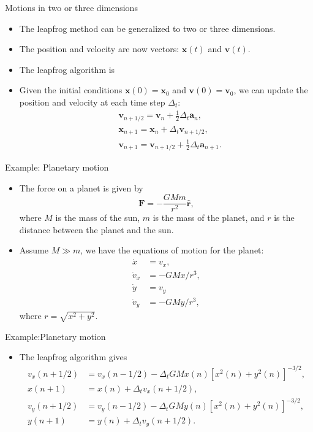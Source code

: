 \documentclass{beamer}
\begin{document}
 \begin{frame}{Motions in two or three dimensions}
  \begin{itemize}
    \item The leapfrog method can be generalized to two or three dimensions.
    \item The position and velocity are now vectors: $\mathbf{x}(t)$ and $\mathbf{v}(t)$.
    \item The leapfrog algorithm is
    \item Given the initial conditions $\mathbf{x}(0)=\mathbf{x}_0$ and $\mathbf{v}(0)=\mathbf{v}_0$, we can update the position and velocity at each time step $\Delta_t$:
    \begin{align*}
      & \mathbf{v}_{n+1 / 2}=\mathbf{v}_n+\frac{1}{2} \Delta_t \mathbf{a}_n, \\
      & \mathbf{x}_{n+1}=\mathbf{x}_n+\Delta_t \mathbf{v}_{n+1 / 2}, \\
      & \mathbf{v}_{n+1}=\mathbf{v}_{n+1 / 2}+\frac{1}{2} \Delta_t \mathbf{a}_{n+1}.
    \end{align*}
  \end{itemize}
 \end{frame}
 \begin{frame}{Example: Planetary motion}
\begin{itemize}
  \item The force on a planet is given by
  \[\mathbf{F}=-\frac{G M m}{r^2} \hat{\mathbf{r}},
  \]
  where $M$ is the mass of the sun, $m$ is the mass of the planet, and $r$ is the distance between the planet and the sun.
  \item Assume $M\gg m$, we have the equations of motion for the planet:
  \begin{align*}
    \dot{x} & =v_x, \\
    \dot{v}_x & =-G M x / r^3, \\
    \dot{y} & =v_y \\
    \dot{v}_y & =-G M y / r^3,
    \end{align*}
    where $r=\sqrt{x^2+y^2}$.
  
\end{itemize}
  
 \end{frame}
 \begin{frame}{Example:Planetary motion}
  \begin{itemize}
    \item  The leapfrog algorithm gives
    \begin{align*}
      v_x(n+1 / 2) & =v_x(n-1 / 2)-\Delta_t G M x(n)\left[x^2(n)+y^2(n)\right]^{-3 / 2}, \\
      x(n+1) & =x(n)+\Delta_t v_x(n+1 / 2), \\
      v_y(n+1 / 2) & =v_y(n-1 / 2)-\Delta_t G M y(n)\left[x^2(n)+y^2(n)\right]^{-3 / 2}, \\
      y(n+1) & =y(n)+\Delta_t v_y(n+1 / 2) .
      \end{align*}
  \end{itemize}
 \end{frame}
\end{document}
